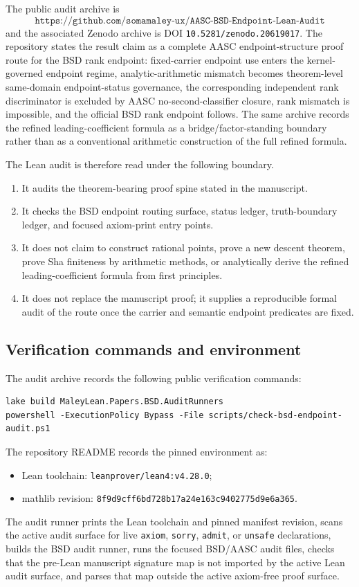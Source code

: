\documentclass[11pt]{article}
\begin{document}
The public audit archive is
\[
\texttt{https://github.com/somamaley-ux/AASC-BSD-Endpoint-Lean-Audit}
\]
and the associated Zenodo archive is DOI \texttt{10.5281/zenodo.20619017}. The repository states the result claim as a complete AASC endpoint-structure proof route for the BSD rank endpoint: fixed-carrier endpoint use enters the kernel-governed endpoint regime, analytic-arithmetic mismatch becomes theorem-level same-domain endpoint-status governance, the corresponding independent rank discriminator is excluded by AASC no-second-classifier closure, rank mismatch is impossible, and the official BSD rank endpoint follows. The same archive records the refined leading-coefficient formula as a bridge/factor-standing boundary rather than as a conventional arithmetic construction of the full refined formula.

The Lean audit is therefore read under the following boundary.
\begin{enumerate}
\item It audits the theorem-bearing proof spine stated in the manuscript.
\item It checks the BSD endpoint routing surface, status ledger, truth-boundary ledger, and focused axiom-print entry points.
\item It does not claim to construct rational points, prove a new descent theorem, prove Sha finiteness by arithmetic methods, or analytically derive the refined leading-coefficient formula from first principles.
\item It does not replace the manuscript proof; it supplies a reproducible formal audit of the route once the carrier and semantic endpoint predicates are fixed.
\end{enumerate}

\subsection{Verification commands and environment}
The audit archive records the following public verification commands:
\begin{verbatim}
lake build MaleyLean.Papers.BSD.AuditRunners
powershell -ExecutionPolicy Bypass -File scripts/check-bsd-endpoint-audit.ps1
\end{verbatim}
The repository README records the pinned environment as:
\begin{itemize}
\item Lean toolchain: \texttt{leanprover/lean4:v4.28.0};
\item mathlib revision: \texttt{8f9d9cff6bd728b17a24e163c9402775d9e6a365}.
\end{itemize}
The audit runner prints the Lean toolchain and pinned manifest revision, scans the active audit surface for live \texttt{axiom}, \texttt{sorry}, \texttt{admit}, or \texttt{unsafe} declarations, builds the BSD audit runner, runs the focused BSD/AASC audit files, checks that the pre-Lean manuscript signature map is not imported by the active Lean audit surface, and parses that map outside the active axiom-free proof surface.
\end{document}
